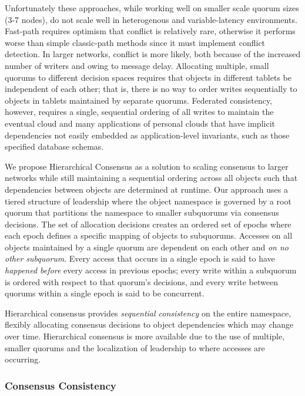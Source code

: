\documentclass{article}
\begin{document}
Unfortunately these approaches, while working well on smaller scale quorum sizes (3-7 nodes), do not scale well in heterogenous and variable-latency environments. Fast-path requires optimism that conflict is relatively rare, otherwise it performs worse than simple classic-path methods since it must implement conflict detection. In larger networks, conflict is more likely, both because of the increased number of writers and owing to message delay. Allocating multiple, small quorums to different decision spaces requires that objects in different tablets be independent of each other; that is, there is no way to order writes sequentially to objects in tablets maintained by separate quorums. Federated consistency, however, requires a single, sequential ordering of all writes to maintain the eventual cloud and many applications of personal clouds that have implicit dependencies not easily embedded as application-level invariants, such as those specified database schemas.

We propose Hierarchical Consensus as a solution to scaling consensus to larger networks while still maintaining a sequential ordering across all objects such that dependencies between objects are determined at runtime. Our approach uses a tiered structure of leadership where the object namespace is governed by a root quorum that partitions the namespace to smaller subquorums via consensus decisions. The set of allocation decisions creates an ordered set of epochs where each epoch defines a specific mapping of objects to subquorums. Accesses on all objects maintained by a single quorum are dependent on each other and \textit{on no other subquorum}. Every access that occurs in a single epoch is said to have \textit{happened before} every access in previous epochs; every write within a subquorum is ordered with respect to that quorum's decisions, and every write between quorums within a single epoch is said to be concurrent.

Hierarchical consensus provides \textit{sequential consistency} on the entire namespace, flexibly allocating consensus decisions to object dependencies which may change over time. Hierarchical consensus is more available due to the use of multiple, smaller quorums and the localization of leadership to where accesses are occurring.

\subsubsection{Consensus Consistency}
\label{sec:consensus_consistency}
\end{document}
